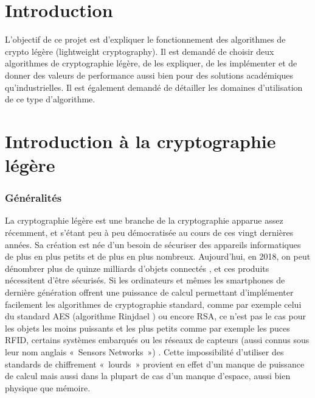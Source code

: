 \clearpage
\part*{Introduction}

L'objectif de ce projet est d'expliquer le fonctionnement des algorithmes de crypto légère (lightweight cryptography).
Il est demandé de choisir deux algorithmes de cryptographie légère, de les expliquer,
de les implémenter et de donner des valeurs de performance aussi bien pour des solutions académiques qu'industrielles.
Il est également demandé de détailler les domaines d'utilisation de ce type d'algorithme.

	\clearpage


	\newpage

\newpage
\part{Introduction à la cryptographie légère}

	\section{Généralités}
	La cryptographie légère est une branche de la cryptographie apparue assez récemment, et s’étant peu à peu démocratisée au cours de ces vingt dernières années.
	Sa création est née d’un besoin de sécuriser des appareils informatiques de plus en plus petits et de plus en plus nombreux.
	Aujourd’hui, en 2018, on peut dénombrer  plus de  quinze milliards d’objets connectés \cite{renaud_developpement_2017}, et ces produits nécessitent d’être sécurisés.
	Si les ordinateurs et mêmes les smartphones de dernière génération offrent une puissance de calcul permettant d’implémenter facilement les algorithmes de cryptographie standard,
	comme par exemple celui du standard AES (algorithme Rinjdael \cite{AES-FIPS}) ou encore RSA,
	ce n’est pas le cas pour les objets les moins puissants et les plus petits comme par exemple les puces RFID,
	certains systèmes embarqués ou les réseaux de capteurs (aussi connus sous leur nom anglais « Sensors Networks ») \cite{Report_light}.
	Cette impossibilité d’utiliser des standards de chiffrement « lourds » provient en effet d’un manque de puissance de calcul mais aussi dans la plupart de cas d’un manque d’espace, aussi bien physique que mémoire.


